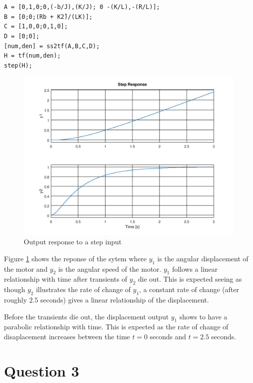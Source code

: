 \documentclass[a4paper, 12pt]{article}
\begin{document}
\noindent
\texttt{A = [0,1,0;0,(-b/J),(K/J); 0 -(K/L),-(R/L)];}\\
\texttt{B = [0;0;(R\*b + K\^2)/(L\*K)];}\\
\texttt{C = [1,0,0;0,1,0];}\\
\texttt{D = [0;0];}\\
\texttt{[num,den] = ss2tf(A,B,C,D);}\\
\texttt{H = tf(num,den);}\\
\texttt{step(H);}\\

\begin{figure}[H]
	\centering
	\includegraphics[width=\textwidth]{Images/question_2_output_response.png}
	\caption{Output response to a step input}
	\label{fig:question_2_output_response}
\end{figure}

Figure \ref{fig:question_2_output_response} shows the reponse of the sytem where $y_1$ is the angular displacement of the motor and $y_2$ is the angular speed of the motor. $y_1$ follows a linear relationship with time after transients of $y_2$ die out. This is expected seeing as though $y_2$ illustrates the rate of change of $y_1$, a constant rate of change (after roughly $2.5$ seconds) gives a linear relationship of the displacement. 

Before the transients die out, the displacement output $y_1$ shows to have a parabolic relationship with time. This is expected as the rate of change of disaplacement increases between the time $t=0$ seconds and $t=2.5$ seconds.    


\section{Question 3}
\end{document}

